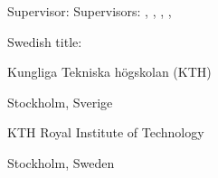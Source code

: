{\begin{flushleft}
{    \ifx\@supervisorBsLastname\@empty
    Supervisor: \@supervisorAsFirstname\space\@supervisorAsLastname
    \else
    Supervisors: \@supervisorAsFirstname\space\@supervisorAsLastname,  \@supervisorBsFirstname\space\@supervisorBsLastname
    \fi
    \ifx\@supervisorCsLastname\@empty
    \else
    , \@supervisorCsFirstname\space\@supervisorCsLastname
    \fi
    \ifx\@supervisorDsLastname\@empty
    \else
    , \@supervisorDsFirstname\space\@supervisorDsLastname
    \fi
    \ifx\@supervisorEsLastname\@empty
    \else
    , \@supervisorEsFirstname\space\@supervisorEsLastname
    \fi
    \par
    \ifx\@alttitle\empty\relax\else Swedish title: %
        \begin{otherlanguage}{swedish}
        \sffamily\@alttitle\end{otherlanguage}
        \par \fi
    \ifx\@altsubtitle\@empty\relax{} %
        \begin{otherlanguage}{swedish}
        \sffamily\@altsubtitle\end{otherlanguage} \par \fi
  \fi
  \ifinswedish
Kungliga Tekniska högskolan (KTH)\par
Stockholm, Sverige \the\year\par
\else
KTH Royal Institute of Technology\par
Stockholm, Sweden \the\year\par
\fi
}
\end{flushleft}
\restoregeometry
\clearpage
}


